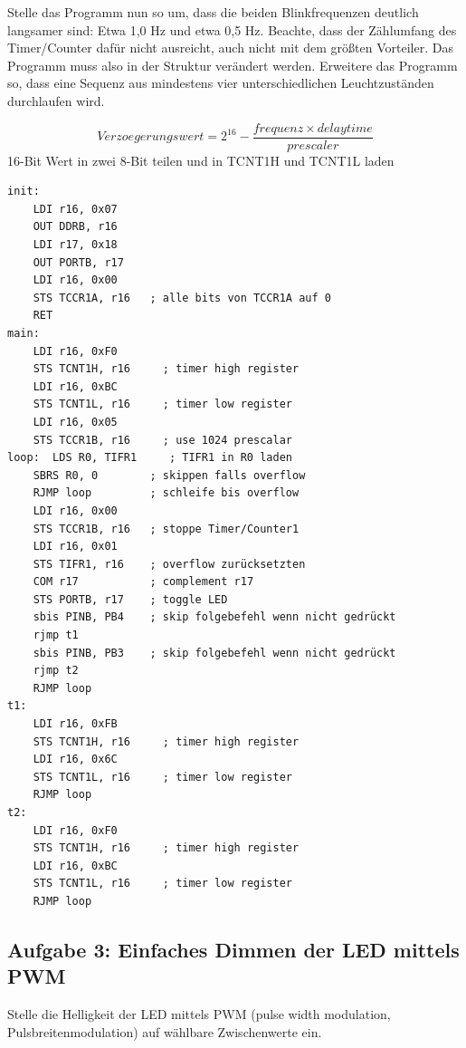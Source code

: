 \documentclass[a4paper,12pt,titlepage]{scrartcl}
\begin{document}
Stelle das Programm nun so um, dass die beiden Blinkfrequenzen deutlich langsamer sind: Etwa 1,0 Hz und etwa 0,5 Hz. Beachte, dass der Zählumfang des Timer/Counter dafür nicht ausreicht, auch nicht mit dem größten Vorteiler. Das Programm muss also in der Struktur verändert werden. Erweitere das Programm so, dass eine Sequenz aus mindestens vier unterschiedlichen Leuchtzuständen durchlaufen wird.

$$Verzoegerungswert = 2^{16}-\frac{frequenz \times delaytime}{prescaler}$$
16-Bit Wert in zwei 8-Bit teilen und in TCNT1H und TCNT1L laden

\begin{lstlisting}[basicstyle=\tiny]
init:
    LDI r16, 0x07 
    OUT DDRB, r16
    LDI r17, 0x18
    OUT PORTB, r17
    LDI r16, 0x00
    STS TCCR1A, r16   ; alle bits von TCCR1A auf 0
    RET
main: 
    LDI r16, 0xF0
    STS TCNT1H, r16     ; timer high register
    LDI r16, 0xBC 
    STS TCNT1L, r16     ; timer low register
    LDI r16, 0x05
    STS TCCR1B, r16     ; use 1024 prescalar
loop:  LDS R0, TIFR1     ; TIFR1 in R0 laden
    SBRS R0, 0        ; skippen falls overflow
    RJMP loop         ; schleife bis overflow
    LDI r16, 0x00
    STS TCCR1B, r16   ; stoppe Timer/Counter1
    LDI r16, 0x01
    STS TIFR1, r16    ; overflow zurücksetzten
    COM r17           ; complement r17 
    STS PORTB, r17    ; toggle LED
    sbis PINB, PB4    ; skip folgebefehl wenn nicht gedrückt 
    rjmp t1
    sbis PINB, PB3    ; skip folgebefehl wenn nicht gedrückt
    rjmp t2
    RJMP loop
t1: 
    LDI r16, 0xFB
    STS TCNT1H, r16     ; timer high register
    LDI r16, 0x6C 
    STS TCNT1L, r16     ; timer low register
    RJMP loop
t2:
    LDI r16, 0xF0
    STS TCNT1H, r16     ; timer high register
    LDI r16, 0xBC 
    STS TCNT1L, r16     ; timer low register
    RJMP loop
\end{lstlisting}

\newpage
\subsection*{Aufgabe 3: Einfaches Dimmen der LED mittels PWM}
Stelle die Helligkeit der LED mittels PWM (pulse width modulation, Pulsbreitenmodulation) auf wählbare Zwischenwerte ein.
\end{document}
